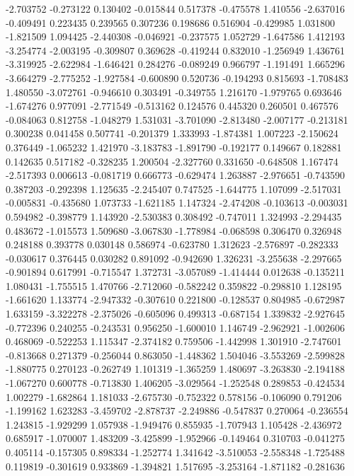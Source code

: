 -2.703752
-0.273122
0.130402
-0.015844
0.517378
-0.475578
1.410556
-2.637016
-0.409491
0.223435
0.239565
0.307236
0.198686
0.516904
-0.429985
1.031800
-1.821509
1.094425
-2.440308
-0.046921
-0.237575
1.052729
-1.647586
1.412193
-3.254774
-2.003195
-0.309807
0.369628
-0.419244
0.832010
-1.256949
1.436761
-3.319925
-2.622984
-1.646421
0.284276
-0.089249
0.966797
-1.191491
1.665296
-3.664279
-2.775252
-1.927584
-0.600890
0.520736
-0.194293
0.815693
-1.708483
1.480550
-3.072761
-0.946610
0.303491
-0.349755
1.216170
-1.979765
0.693646
-1.674276
0.977091
-2.771549
-0.513162
0.124576
0.445320
0.260501
0.467576
-0.084063
0.812758
-1.048279
1.531031
-3.701090
-2.813480
-2.007177
-0.213181
0.300238
0.041458
0.507741
-0.201379
1.333993
-1.874381
1.007223
-2.150624
0.376449
-1.065232
1.421970
-3.183783
-1.891790
-0.192177
0.149667
0.182881
0.142635
0.517182
-0.328235
1.200504
-2.327760
0.331650
-0.648508
1.167474
-2.517393
0.006613
-0.081719
0.666773
-0.629474
1.263887
-2.976651
-0.743590
0.387203
-0.292398
1.125635
-2.245407
0.747525
-1.644775
1.107099
-2.517031
-0.005831
-0.435680
1.073733
-1.621185
1.147324
-2.474208
-0.103613
-0.003031
0.594982
-0.398779
1.143920
-2.530383
0.308492
-0.747011
1.324993
-2.294435
0.483672
-1.015573
1.509680
-3.067830
-1.778984
-0.068598
0.306470
0.326948
0.248188
0.393778
0.030148
0.586974
-0.623780
1.312623
-2.576897
-0.282333
-0.030617
0.376445
0.030282
0.891092
-0.942690
1.326231
-3.255638
-2.297665
-0.901894
0.617991
-0.715547
1.372731
-3.057089
-1.414444
0.012638
-0.135211
1.080431
-1.755515
1.470766
-2.712060
-0.582242
0.359822
-0.298810
1.128195
-1.661620
1.133774
-2.947332
-0.307610
0.221800
-0.128537
0.804985
-0.672987
1.633159
-3.322278
-2.375026
-0.605096
0.499313
-0.687154
1.339832
-2.927645
-0.772396
0.240255
-0.243531
0.956250
-1.600010
1.146749
-2.962921
-1.002606
0.468069
-0.522253
1.115347
-2.374182
0.759506
-1.442998
1.301910
-2.747601
-0.813668
0.271379
-0.256044
0.863050
-1.448362
1.504046
-3.553269
-2.599828
-1.880775
0.270123
-0.262749
1.101319
-1.365259
1.480697
-3.263830
-2.194188
-1.067270
0.600778
-0.713830
1.406205
-3.029564
-1.252548
0.289853
-0.424534
1.002279
-1.682864
1.181033
-2.675730
-0.752322
0.578156
-0.106090
0.791206
-1.199162
1.623283
-3.459702
-2.878737
-2.249886
-0.547837
0.270064
-0.236554
1.243815
-1.929299
1.057938
-1.949476
0.855935
-1.707943
1.105428
-2.436972
0.685917
-1.070007
1.483209
-3.425899
-1.952966
-0.149464
0.310703
-0.041275
0.405114
-0.157305
0.898334
-1.252774
1.341642
-3.510053
-2.558348
-1.725488
0.119819
-0.301619
0.933869
-1.394821
1.517695
-3.253164
-1.871182
-0.281636

